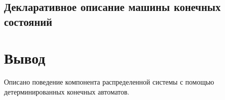 		\FloatBarrier
	\subsection{Декларативное описание машины конечных состояний}
		
	

\section{Вывод}
	Описано поведение компонента распределенной системы с помощью детерминированных конечных автоматов.